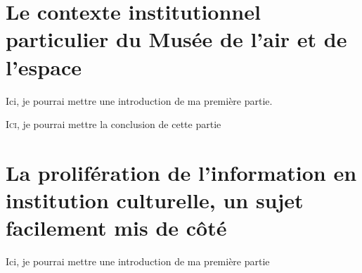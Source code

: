 \documentclass[12pt,twoside]{book}
\begin{document}
	
	
	
	
	\nocite{*}
	
	
	\newpage{\pagestyle{empty}\cleardoublepage}
	
	
	\mainmatter
	
	
	\part{Le contexte institutionnel particulier du Musée de l'air et de l'espace}
	
	
	Ici, je pourrai mettre une introduction de ma première partie.
	
	
	 
	
	
	
	\lettrine{I}{ci}, je pourrai mettre la conclusion de cette partie
	
	
	\part{La prolifération de l'information en institution culturelle, un sujet facilement mis de côté}
	
	
	Ici, je pourrai mettre une introduction de ma première partie
	
\end{document}
